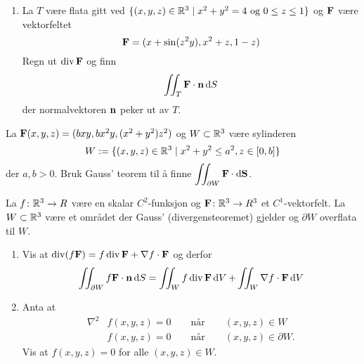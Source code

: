 

\oppgave[V2017, Oppgave 5]

\begin{enumerate}
  \item La $T$ være flata gitt ved $\{(x,y,z) \in \mathbb{R}^3 \mid x^2 + y^2 = 4
    \ \text{og} \ 0 \leq z \leq 1\}$ og $\mathbf{F}$ være vektorfeltet
    \begin{equation*}
      \mathbf{F} = (x + \sin(z^2y), x^2 + z, 1 - z)
    \end{equation*}
    Regn ut $\operatorname{div} \mathbf{F}$ og finn
    \begin{equation*}
      \iint_T \mathbf{F} \cdot \mathbf{n} \mathop{}\! \mathrm{d} S\mathop{}\! 
    \end{equation*}
    der normalvektoren $\mathbf{n}$ peker ut av $T$.
\end{enumerate}

\oppgave[K2016, Oppgave 7]

La $\mathbf{F}(x,y,z) = (bxy, bx^2y, (x^2 + y^2)z^2)$ og $W \subset \mathbb{R}^3$ være
sylinderen
%
\begin{equation*}
  W := \{  (x,y,z) \in \mathbb{R}^3 \mid x^2 + y^2 \leq a^2, z \in [0, b]\}
\end{equation*}
%
der $a, b > 0$. Bruk Gauss' teorem til å finne $\displaystyle \iint_{\partial W} \mathbf{F} \cdot
\mathop{}\! \mathrm{d} \mathbf{S}\mathop{}\!$.

\oppgave[V2016, Oppgave 7]

La $f \colon \mathbb{R}^3 \to R$ være en skalar $C^2$-funksjon og $\mathbf{F} \colon \mathbb{R}^3
\to R^3$ et $C^1$-vektorfelt. La $W \subset \mathbb{R}^3$ være et området der Gauss'
(divergensteoremet) gjelder og $\partial W$ overflata til $W$.

\begin{enumerate}
    \item Vis at $\operatorname{div}(f \mathbf{F}) = f \operatorname{div} \mathbf{F} + \nabla f \cdot \mathbf{F}$ og derfor
    \begin{equation*}
      \iint_{\partial W} f \mathbf{F} \cdot \mathbf{n} \mathop{}\! \mathrm{d} S\mathop{}\!
      = \iint_{W} f \operatorname{div} \mathbf{F} \mathop{}\! \mathrm{d} V\mathop{}\!
      + \iint_{W} \nabla f \cdot \mathbf{F} \mathop{}\! \mathrm{d} V\mathop{}\! 
    \end{equation*}
  \item Anta at
    \begin{align*}
      \nabla^2 & f(x,y,z) = 0 \qquad \text{når} \qquad (x,y,z) \in W  \\
               & f(x,y,z) = 0 \qquad \text{når} \qquad (x,y,z) \in \partial W. 
    \end{align*}
    Vis at $f(x,y,z) = 0$ for alle $(x,y,z) \in W$. 
\end{enumerate}

